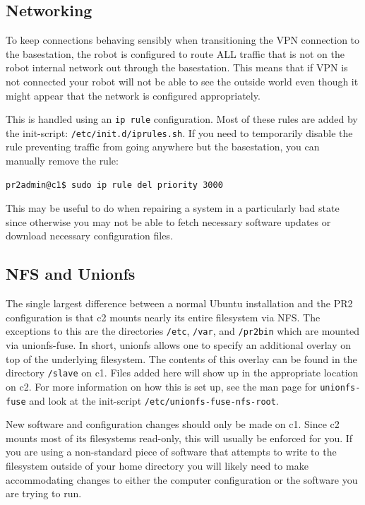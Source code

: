 \subsection{Networking}
To keep connections behaving sensibly when transitioning the VPN
connection to the basestation, the robot is configured to route ALL
traffic that is not on the robot internal network out through the
basestation.  This means that if VPN is not connected your robot will
not be able to see the outside world even though it might appear that
the network is configured appropriately.

This is handled using an \texttt{ip rule} configuration.  Most of
these rules are added by the init-script:
\texttt{/etc/init.d/iprules.sh}.  If you need to temporarily disable
the rule preventing traffic from going anywhere but the basestation,
you can manually remove the rule:

\begin{verbatim}
pr2admin@c1$ sudo ip rule del priority 3000
\end{verbatim}

This may be useful to do when repairing a system in a particularly bad
state since otherwise you may not be able to fetch necessary software
updates or download necessary configuration files.

\subsection{NFS and Unionfs}
The single largest difference between a normal Ubuntu installation and
the PR2 configuration is that c2 mounts nearly its entire filesystem
via NFS.  The exceptions to this are the directories \texttt{/etc},
\texttt{/var}, and \texttt{/pr2bin} which are mounted via
unionfs-fuse.  In short, unionfs allows one to specify an additional
overlay on top of the underlying filesystem.  The contents of this
overlay can be found in the directory \texttt{/slave} on c1.  Files
added here will show up in the appropriate location on c2.  For more
information on how this is set up, see the man page for
\texttt{unionfs-fuse} and look at the init-script
\texttt{/etc/unionfs-fuse-nfs-root}.

New software and configuration changes should only be made on c1.
Since c2 mounts most of its filesystems read-only, this will usually
be enforced for you.  If you are using a non-standard piece of
software that attempts to write to the filesystem outside of your home
directory you will likely need to make accommodating changes to either
the computer configuration or the software you are trying to run.

